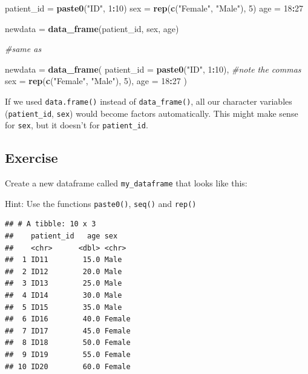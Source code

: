 \documentclass[]{book}
\makeatletter
\newenvironment{Shaded}{\begin{snugshade}}{\end{snugshade}}
\newcommand{\KeywordTok}[1]{\textcolor[rgb]{0.13,0.29,0.53}{\textbf{#1}}}
\newcommand{\DataTypeTok}[1]{\textcolor[rgb]{0.13,0.29,0.53}{#1}}
\newcommand{\DecValTok}[1]{\textcolor[rgb]{0.00,0.00,0.81}{#1}}
\newcommand{\StringTok}[1]{\textcolor[rgb]{0.31,0.60,0.02}{#1}}
\newcommand{\CommentTok}[1]{\textcolor[rgb]{0.56,0.35,0.01}{\textit{#1}}}
\newcommand{\OperatorTok}[1]{\textcolor[rgb]{0.81,0.36,0.00}{\textbf{#1}}}
\newcommand{\NormalTok}[1]{#1}
\newenvironment{kframe}{%
\medskip{}
\setlength{\fboxsep}{.8em}
 \def\at@end@of@kframe{}%
 \ifinner\ifhmode%
  \def\at@end@of@kframe{\end{minipage}}%
  \begin{minipage}{\columnwidth}%
 \fi\fi%
 \def\FrameCommand##1{\hskip\@totalleftmargin \hskip-\fboxsep
 \colorbox{shadecolor}{##1}\hskip-\fboxsep
     \hskip-\linewidth \hskip-\@totalleftmargin \hskip\columnwidth}%
 \MakeFramed {\advance\hsize-\width
   \@totalleftmargin\z@ \linewidth\hsize
   \@setminipage}}%
 {\par\unskip\endMakeFramed%
 \at@end@of@kframe}
\renewenvironment{Shaded}{\begin{kframe}}{\end{kframe}}
\makeatother
\begin{document}
\begin{Shaded}
\begin{Highlighting}[]
\NormalTok{patient_id =}\StringTok{ }\KeywordTok{paste0}\NormalTok{(}\StringTok{"ID"}\NormalTok{, }\DecValTok{1}\OperatorTok{:}\DecValTok{10}\NormalTok{)}
\NormalTok{sex        =}\StringTok{ }\KeywordTok{rep}\NormalTok{(}\KeywordTok{c}\NormalTok{(}\StringTok{"Female"}\NormalTok{, }\StringTok{"Male"}\NormalTok{), }\DecValTok{5}\NormalTok{)}
\NormalTok{age        =}\StringTok{ }\DecValTok{18}\OperatorTok{:}\DecValTok{27}

\NormalTok{newdata =}\StringTok{ }\KeywordTok{data_frame}\NormalTok{(patient_id, sex, age)}

\CommentTok{#same as}

\NormalTok{newdata      =}\StringTok{ }\KeywordTok{data_frame}\NormalTok{(}
  \DataTypeTok{patient_id =} \KeywordTok{paste0}\NormalTok{(}\StringTok{"ID"}\NormalTok{, }\DecValTok{1}\OperatorTok{:}\DecValTok{10}\NormalTok{), }\CommentTok{#note the commas}
  \DataTypeTok{sex        =} \KeywordTok{rep}\NormalTok{(}\KeywordTok{c}\NormalTok{(}\StringTok{"Female"}\NormalTok{, }\StringTok{"Male"}\NormalTok{), }\DecValTok{5}\NormalTok{),}
  \DataTypeTok{age        =} \DecValTok{18}\OperatorTok{:}\DecValTok{27}
\NormalTok{)}
\end{Highlighting}
\end{Shaded}

If we used \texttt{data.frame()} instead of \texttt{data\_frame()}, all
our character variables (\texttt{patient\_id}, \texttt{sex}) would
become factors automatically. This might make sense for \texttt{sex},
but it doesn't for \texttt{patient\_id}.

\subsection{Exercise}\label{exercise-15}

Create a new dataframe called \texttt{my\_dataframe} that looks like
this:

Hint: Use the functions \texttt{paste0()}, \texttt{seq()} and
\texttt{rep()}

\begin{verbatim}
## # A tibble: 10 x 3
##    patient_id   age sex   
##    <chr>      <dbl> <chr> 
##  1 ID11        15.0 Male  
##  2 ID12        20.0 Male  
##  3 ID13        25.0 Male  
##  4 ID14        30.0 Male  
##  5 ID15        35.0 Male  
##  6 ID16        40.0 Female
##  7 ID17        45.0 Female
##  8 ID18        50.0 Female
##  9 ID19        55.0 Female
## 10 ID20        60.0 Female
\end{verbatim}
\end{document}
